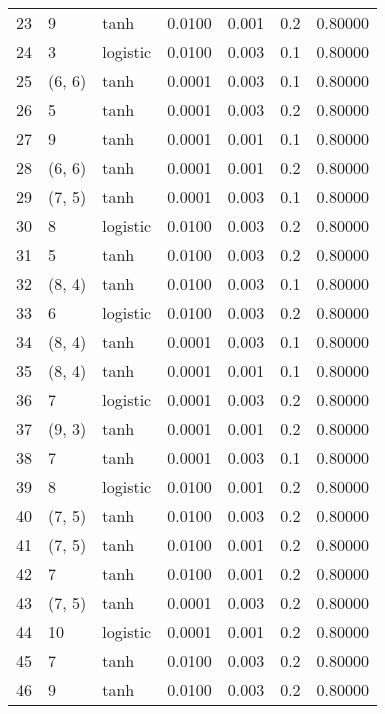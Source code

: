 \begin{tabular}{lllrrrr}
23  &           9 &      tanh &  0.0100 &  0.001 &  0.2 &   0.80000 \\
24  &           3 &  logistic &  0.0100 &  0.003 &  0.1 &   0.80000 \\
25  &      (6, 6) &      tanh &  0.0001 &  0.003 &  0.1 &   0.80000 \\
26  &           5 &      tanh &  0.0001 &  0.003 &  0.2 &   0.80000 \\
27  &           9 &      tanh &  0.0001 &  0.001 &  0.1 &   0.80000 \\
28  &      (6, 6) &      tanh &  0.0001 &  0.001 &  0.2 &   0.80000 \\
29  &      (7, 5) &      tanh &  0.0001 &  0.003 &  0.1 &   0.80000 \\
30  &           8 &  logistic &  0.0100 &  0.003 &  0.2 &   0.80000 \\
31  &           5 &      tanh &  0.0100 &  0.003 &  0.2 &   0.80000 \\
32  &      (8, 4) &      tanh &  0.0100 &  0.003 &  0.1 &   0.80000 \\
33  &           6 &  logistic &  0.0100 &  0.003 &  0.2 &   0.80000 \\
34  &      (8, 4) &      tanh &  0.0001 &  0.003 &  0.1 &   0.80000 \\
35  &      (8, 4) &      tanh &  0.0001 &  0.001 &  0.1 &   0.80000 \\
36  &           7 &  logistic &  0.0001 &  0.003 &  0.2 &   0.80000 \\
37  &      (9, 3) &      tanh &  0.0001 &  0.001 &  0.2 &   0.80000 \\
38  &           7 &      tanh &  0.0001 &  0.003 &  0.1 &   0.80000 \\
39  &           8 &  logistic &  0.0100 &  0.001 &  0.2 &   0.80000 \\
40  &      (7, 5) &      tanh &  0.0100 &  0.003 &  0.2 &   0.80000 \\
41  &      (7, 5) &      tanh &  0.0100 &  0.001 &  0.2 &   0.80000 \\
42  &           7 &      tanh &  0.0100 &  0.001 &  0.2 &   0.80000 \\
43  &      (7, 5) &      tanh &  0.0001 &  0.003 &  0.2 &   0.80000 \\
44  &          10 &  logistic &  0.0001 &  0.001 &  0.2 &   0.80000 \\
45  &           7 &      tanh &  0.0100 &  0.003 &  0.2 &   0.80000 \\
46  &           9 &      tanh &  0.0100 &  0.003 &  0.2 &   0.80000 \\

\end{tabular}
